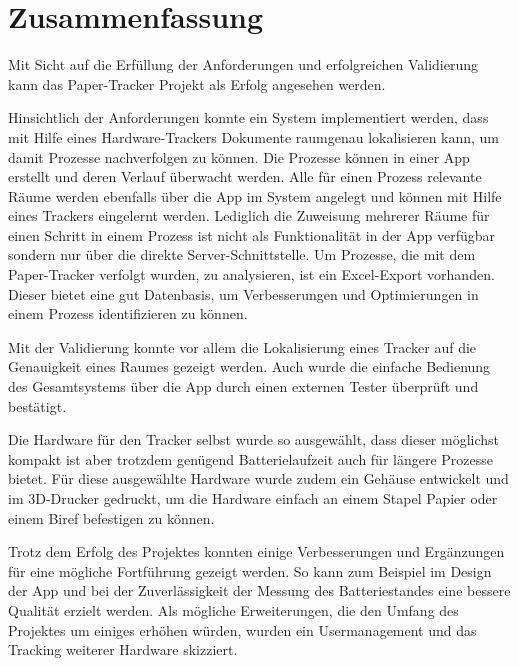 \chapter{Zusammenfassung}

Mit Sicht auf die Erfüllung der Anforderungen und erfolgreichen Validierung kann das Paper-Tracker Projekt als
Erfolg angesehen werden.

Hinsichtlich der Anforderungen konnte ein System implementiert werden, dass mit Hilfe eines Hardware-Trackers Dokumente
raumgenau lokalisieren kann, um damit Prozesse nachverfolgen zu können.
Die Prozesse können in einer App erstellt und deren Verlauf überwacht werden.
Alle für einen Prozess relevante Räume werden ebenfalls über die App im System angelegt und können mit Hilfe eines
Trackers eingelernt werden.
Lediglich die Zuweisung mehrerer Räume für einen Schritt in einem Prozess ist nicht als Funktionalität in der App
verfügbar sondern nur über die direkte Server-Schnittstelle.
Um Prozesse, die mit dem Paper-Tracker verfolgt wurden, zu analysieren, ist ein Excel-Export vorhanden.
Dieser bietet eine gut Datenbasis, um Verbesserungen und Optimierungen in einem Prozess identifizieren zu können.

Mit der Validierung konnte vor allem die Lokalisierung eines Tracker auf die Genauigkeit eines Raumes gezeigt werden.
Auch wurde die einfache Bedienung des Gesamtsystems über die App durch einen externen Tester überprüft und bestätigt.

Die Hardware für den Tracker selbst wurde so ausgewählt, dass dieser möglichst kompakt ist aber trotzdem genügend
Batterielaufzeit auch für längere Prozesse bietet.
Für diese ausgewählte Hardware wurde zudem ein Gehäuse entwickelt und im 3D-Drucker gedruckt, um die Hardware
einfach an einem Stapel Papier oder einem Biref befestigen zu können.

Trotz dem Erfolg des Projektes konnten einige Verbesserungen und Ergänzungen für eine mögliche Fortführung gezeigt werden.
So kann zum Beispiel im Design der App und bei der Zuverlässigkeit der Messung des Batteriestandes eine bessere Qualität erzielt werden.
Als mögliche Erweiterungen, die den Umfang des Projektes um einiges erhöhen würden, wurden ein Usermanagement und das Tracking weiterer Hardware skizziert.
